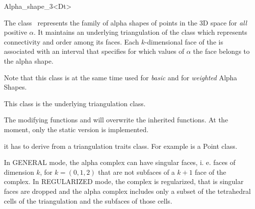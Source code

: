 \begin{ccRefClass} {Alpha_shape_3<Dt>}

\ccDefinition

The class \ccClassTemplateName\ represents the family of
alpha shapes of points in the 3D space for {\em all} positive
$\alpha$. It maintains an  underlying triangulation 
of the class  which
represents connectivity and order among its faces. Each
$k$-dimensional face of the  is associated with
an interval that specifies for which values of $\alpha$ the face
belongs to the alpha shape. 

Note that this class is at the same time used for {\em basic} and
for {\em weighted} Alpha Shapes.

\ccInheritsFrom


This class is the underlying triangulation class.

The modifying functions  and  will overwrite
the inherited functions. At the moment, only the static version is implemented.

\ccTypes
{}
\ccThreeToTwo

it has to derive from a triangulation traits class.  
For example  is a Point class. 






{ In GENERAL mode, the alpha complex  can have singular faces,
 i. e. faces of dimension $k$, for $k=(0,1,2)$
that are not subfaces of a $k+1$ face of the complex.
In  REGULARIZED mode, the complex is regularized, that is
singular faces are dropped and the alpha complex 
includes only a subset of the tetrahedral cells 
of the triangulation and the subfaces of those cells.}



\end{ccRefClass}
